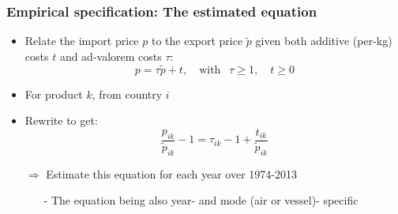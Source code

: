 \documentclass[10 pt,Helvetica, french]{beamer}
\begin{document}
\begin{frame}
\frametitle{Empirical specification: The estimated equation}
\begin{itemize}
\item Relate the import price $p$ to the export price $\widetilde{p}$ given both additive (per-kg) costs $t$ and ad-valorem costs $\tau$:
$$p = \tau \widetilde{p} + t, \quad \text{with }~~\tau \geq 1, \quad t \geq 0$$
\item For product $k$, from country $i$  \vspace{0.1cm}
\item Rewrite to get:
$$\frac{p_{ik}}{\widetilde{p}_{ik}} -1 = \tau_{ik} -1 +\frac{t_{ik}}{ \widetilde{p}_{ik}}$$
\item[$\Rightarrow$] Estimate this equation for each year over 1974-2013 \vspace{0.1cm}
\begin{itemize}
\item[-] The equation being also year- and mode (air or vessel)- specific
\end{itemize}

\end{itemize}
\end{frame}
\end{document}
